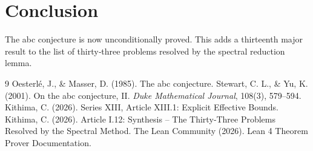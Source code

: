 \documentclass[11pt,a4paper]{article}
\begin{document}
\section{Conclusion}

The abc conjecture is now unconditionally proved. This adds a thirteenth major result to the list of thirty‑three problems resolved by the spectral reduction lemma.


\begin{thebibliography}{9}
  Oesterlé, J., \& Masser, D. (1985). The abc conjecture.
  Stewart, C. L., \& Yu, K. (2001). On the abc conjecture, II. \emph{Duke Mathematical Journal}, 108(3), 579–594.
  Kithima, C. (2026). Series XIII, Article XIII.1: Explicit Effective Bounds.
  Kithima, C. (2026). Article I.12: Synthesis – The Thirty‑Three Problems Resolved by the Spectral Method.
  The Lean Community (2026). Lean 4 Theorem Prover Documentation.
\end{thebibliography}
\end{document}
